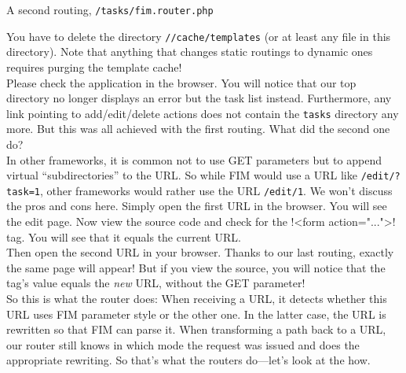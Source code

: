 \documentclass{scrartcl}
\begin{document}
      \begin{listing}[H]
         \caption{A second routing, \texttt{/tasks/fim.router.php}}
      \end{listing}
      You have to delete the directory \texttt{//cache/templates} (or at least any file in this directory). Note that anything that changes static routings to dynamic ones requires purging the template cache! \\
      Please check the application in the browser. You will notice that our top directory no longer displays an error but the task list instead. Furthermore, any link pointing to add/edit/delete actions does not contain the \texttt{tasks} directory any more. But this was all achieved with the first routing. What did the second one do? \\
      In other frameworks, it is common not to use GET parameters but to append virtual ``subdi\-rectories'' to the URL. So while FIM would use a URL like \texttt{/edit/?task=1}, other frameworks would rather use the URL \texttt{/edit/1}. We won't discuss the pros and cons here. Simply open the first URL in the browser. You will see the edit page. Now view the source code and check for the \smarty!<form action="...">! tag. You will see that it equals the current URL. \\
      Then open the second URL in your browser. Thanks to our last routing, exactly the same page will appear! But if you view the source, you will notice that the tag's value equals the \emph{new} URL, without the GET parameter! \\
      So this is what the router does: When receiving a URL, it detects whether this URL uses FIM parameter style or the other one. In the latter case, the URL is rewritten so that FIM can parse it. When transforming a path back to a URL, our router still knows in which mode the request was issued and does the appropriate rewriting. So that's what the routers do---let's look at the how.
\end{document}
